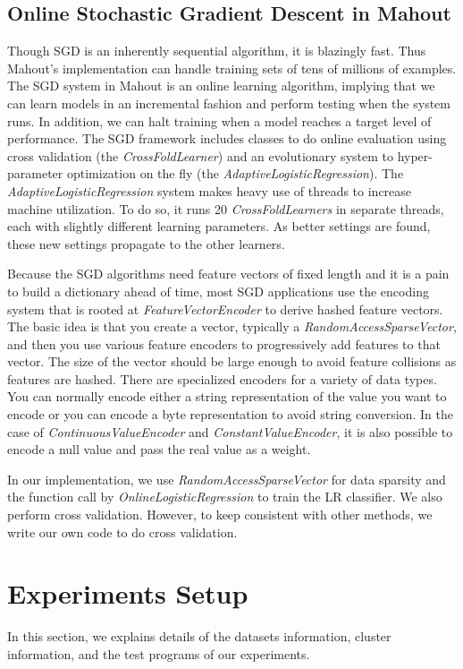 \documentclass[10pt, conference, compsocconf]{IEEEtran}
\begin{document}
\subsection{Online Stochastic Gradient Descent in Mahout}
Though SGD is an inherently sequential algorithm, it is blazingly fast. Thus Mahout's implementation can handle training sets of tens of millions of examples.
The SGD system in Mahout is an online learning algorithm, implying that we can learn models in an incremental fashion and perform testing when the system runs.
In addition, we can halt training when a model reaches a target level of performance.
The SGD framework includes classes to do online evaluation using cross validation (the \textit{CrossFoldLearner}) and an evolutionary system to hyper-parameter optimization on the fly (the \textit{AdaptiveLogisticRegression}).
The \textit{AdaptiveLogisticRegression} system makes heavy use of threads to increase machine utilization.
To do so, it runs 20 \textit{CrossFoldLearners} in separate threads, each with slightly different learning parameters.
As better settings are found, these new settings propagate to the other learners.

Because the SGD algorithms need feature vectors of fixed length and it is a pain to build a dictionary ahead of time, most SGD applications use the encoding system that is rooted at \textit{FeatureVectorEncoder} to derive hashed feature vectors.
The basic idea is that you create a vector, typically a \textit{RandomAccessSparseVector}, and then you use various feature encoders to progressively add features to that vector.
The size of the vector should be large enough to avoid feature collisions as features are hashed.
There are specialized encoders for a variety of data types.
You can normally encode either a string representation of the value you want to encode or you can encode a byte representation to avoid string conversion.
In the case of \textit{ContinuousValueEncoder} and \textit{ConstantValueEncoder}, it is also possible to encode a null value and pass the real value as a weight.

In our implementation, we use \textit{RandomAccessSparseVector} for data sparsity and the function call by \textit{OnlineLogisticRegression} to train the LR classifier.
We also perform cross validation. However, to keep consistent with other methods, we write our own code to do cross validation.
	
\section{Experiments Setup} \label{sec:setup}
In this section, we explains details of the datasets information, cluster information, and the test programs of our experiments.
\end{document}
